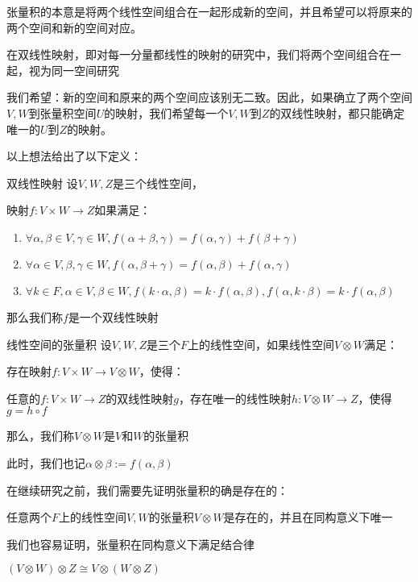 \documentclass[12pt, a4paper, oneside, UTF8]{ctexbook}
\begin{document}
			张量积的本意是将两个线性空间组合在一起形成新的空间，并且希望可以将原来的两个空间和新的空间对应。

			在双线性映射，即对每一分量都线性的映射的研究中，我们将两个空间组合在一起，视为同一空间研究

			我们希望：新的空间和原来的两个空间应该别无二致。因此，如果确立了两个空间$V,W$到张量积空间$U$的映射，我们希望每一个$V,W$到$Z$的双线性映射，都只能确定唯一的$U$到$Z$的映射。

			以上想法给出了以下定义：
			\begin{defn}{双线性映射}{}
				设$V,W,Z$是三个线性空间，

				映射$f:V \times W \to Z$如果满足：

				\begin{enumerate}
					\item $\forall \alpha ,\beta \in V,\gamma \in W,f(\alpha +\beta ,\gamma )=f(\alpha ,\gamma )+f(\beta +\gamma )$
					\item $\forall \alpha \in V,\beta ,\gamma \in W,f(\alpha ,\beta +\gamma )=f(\alpha ,\beta )+f(\alpha ,\gamma )$
					\item $\forall k \in F,\alpha \in V,\beta \in W,f(k\cdot\alpha ,\beta )=k\cdot f(\alpha ,\beta ),f(\alpha ,k\cdot \beta )=k\cdot f(\alpha ,\beta )$ 
				\end{enumerate}
				那么我们称$f$是一个双线性映射
			\end{defn}
			\begin{defn}{线性空间的张量积}{}
				设$V,W,Z$是三个$F$上的线性空间，如果线性空间$V \otimes W$满足：

				存在映射$f:V \times W \to V \otimes W$，使得：

				任意的$f:V \times W \to Z$的双线性映射$g$，存在唯一的线性映射$h:V \otimes W \to Z$，使得$g = h \circ f$

				那么，我们称$V \otimes W$是$V$和$W$的张量积

				此时，我们也记$\alpha \otimes \beta := f(\alpha ,\beta )$
			\end{defn}
			在继续研究之前，我们需要先证明张量积的确是存在的：
			\begin{proposition}
				任意两个$F$上的线性空间$V,W$的张量积$V \otimes W$是存在的，并且在同构意义下唯一
			\end{proposition}
			我们也容易证明，张量积在同构意义下满足结合律
			\begin{proposition}
				$(V \otimes W) \otimes Z \cong V \otimes (W \otimes Z)$
			\end{proposition}
\end{document}
